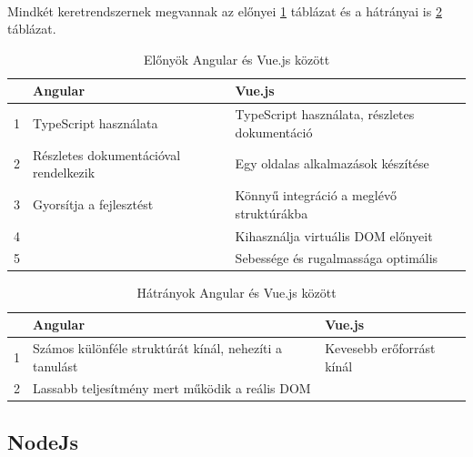	\paragraph{}
	Mindkét keretrendszernek megvannak az előnyei \ref{tab:table1} táblázat és a hátrányai is \ref{tab:table2} táblázat. 
	\begin{table}[H]
	\begin{footnotesize}
		\begin{center}
			\caption{Előnyök Angular és Vue.js között \cite{vuevsang} }
			\label{tab:table1}
			\begin{tabular}{p{0.5cm}|p{6cm}|p{6cm}}
				\textbf & \textbf{Angular} & \textbf{Vue.js}\\
				\hline
				1 & TypeScript használata & TypeScript használata, részletes dokumentáció\\
				\hline
				2 & Részletes dokumentációval rendelkezik & Egy oldalas alkalmazások készítése \\
				\hline
				3 & Gyorsítja a fejlesztést & Könnyű integráció a meglévő struktúrákba \\
				\hline
				4 & & Kihasználja virtuális DOM előnyeit \\
				\hline
				5 & & Sebessége és rugalmassága optimális \\
			\end{tabular}
		\end{center}
	\end{footnotesize}
	\end{table}

	\begin{table}[H]
	\begin{footnotesize}
		\begin{center}
			\caption{Hátrányok Angular és Vue.js között \cite{vuevsang}}
			\label{tab:table2}
			\begin{tabular}{p{0.5cm}|p{6cm}|p{6cm}} 
				\textbf & \textbf{Angular} & \textbf{Vue.js}\\
				\hline
				1 & Számos különféle struktúrát kínál, nehezíti a tanulást & Kevesebb erőforrást kínál\\
				\hline
				2 & Lassabb teljesítmény mert működik a reális DOM &  \\
			\end{tabular}
		\end{center}
	\end{footnotesize}
	\end{table}

	\subsection{NodeJs}
